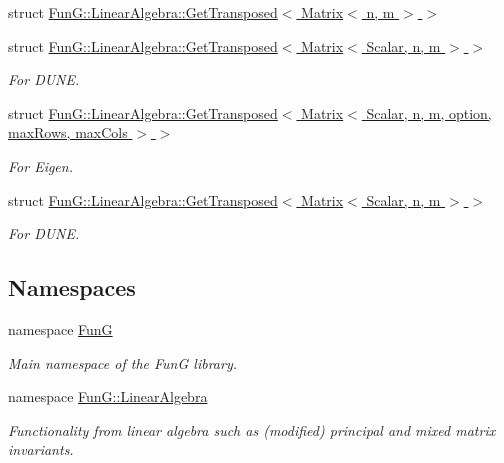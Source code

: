 \begin{DoxyCompactItemize}
\item 
struct \hyperlink{structFunG_1_1LinearAlgebra_1_1GetTransposed_3_01Matrix_3_01n_00_01m_01_4_01_4}{\-Fun\-G\-::\-Linear\-Algebra\-::\-Get\-Transposed$<$ Matrix$<$ n, m $>$ $>$}
\item 
struct \hyperlink{structFunG_1_1LinearAlgebra_1_1GetTransposed_3_01Matrix_3_01Scalar_00_01n_00_01m_01_4_01_4}{\-Fun\-G\-::\-Linear\-Algebra\-::\-Get\-Transposed$<$ Matrix$<$ Scalar, n, m $>$ $>$}
\begin{DoxyCompactList}\small\item\em \-For \-D\-U\-N\-E. \end{DoxyCompactList}\item 
struct \hyperlink{structFunG_1_1LinearAlgebra_1_1GetTransposed_3_01Matrix_3_01Scalar_00_01n_00_01m_00_01option_00_837706e7e2f5ff6060578b88ee4bef60}{\-Fun\-G\-::\-Linear\-Algebra\-::\-Get\-Transposed$<$ Matrix$<$ Scalar, n, m, option, max\-Rows, max\-Cols $>$ $>$}
\begin{DoxyCompactList}\small\item\em \-For \-Eigen. \end{DoxyCompactList}\item 
struct \hyperlink{structFunG_1_1LinearAlgebra_1_1GetTransposed_3_01Matrix_3_01Scalar_00_01n_00_01m_01_4_01_4}{\-Fun\-G\-::\-Linear\-Algebra\-::\-Get\-Transposed$<$ Matrix$<$ Scalar, n, m $>$ $>$}
\begin{DoxyCompactList}\small\item\em \-For \-D\-U\-N\-E. \end{DoxyCompactList}\end{DoxyCompactItemize}
\subsection*{\-Namespaces}
\begin{DoxyCompactItemize}
\item 
namespace \hyperlink{namespaceFunG}{\-Fun\-G}
\begin{DoxyCompactList}\small\item\em \-Main namespace of the \-Fun\-G library. \end{DoxyCompactList}\item 
namespace \hyperlink{namespaceFunG_1_1LinearAlgebra}{\-Fun\-G\-::\-Linear\-Algebra}
\begin{DoxyCompactList}\small\item\em \-Functionality from linear algebra such as (modified) principal and mixed matrix invariants. \end{DoxyCompactList}\end{DoxyCompactItemize}
